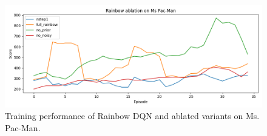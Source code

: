 \documentclass{article}
\begin{document}
\begin{figure}[htbp]
  \centering
  \includegraphics[width=\linewidth]{rainbow_ablation_smooth.png}
  \caption{Training performance of Rainbow DQN and ablated variants on Ms. Pac-Man.}
  \label{fig:rainbow_ablation}
\end{figure}

\clearpage
{}


\end{document}
